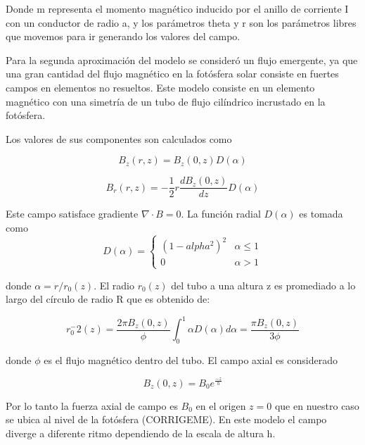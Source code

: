 \documentclass[9pt]{book}
\begin{document}
Donde m representa el momento magn\'etico inducido por el anillo de corriente I con un conductor de radio a, y los par\'ametros theta y r son los par\'ametros libres que movemos para ir generando los valores del campo.

Para la segunda aproximaci\'on del modelo se consider\'o un flujo emergente, ya que una gran cantidad del flujo magn\'etico en la fot\'osfera solar consiste en fuertes campos en elementos no resueltos. Este modelo consiste en un elemento magn\'etico con una simetr\'ia de un tubo de flujo cil\'indrico incrustado en la fot\'osfera.

Los valores de sus componentes son calculados como

\begin{equation}
B_z(r,z)=B_z(0,z)D(\alpha)
\end{equation}

\begin{equation}
B_r(r,z)=-\frac{1}{2}r\frac{dB_z(0,z)}{dz}D(\alpha)
\end{equation}

Este campo satisface gradiente $ \nabla \cdot B = 0 $. La funci\'on radial $D(\alpha)$ es tomada como
\begin{equation}
 D(\alpha) = 
    \begin{cases}
        (1-alpha^2)^2 & \alpha \leq 1 \\
        0   & \alpha > 1
    \end{cases}
\end{equation}

donde $\alpha = r/r_0(z)$. El radio $r_0(z)$ del tubo a una altura z es promediado a lo largo del c\'irculo de radio R que es obtenido de:

\begin{equation} \label{r_flujo_emergente}
r_0^-2(z) = \frac{2\pi B_z(0,z)}{\phi} \int_{0}^{1} \alpha D(\alpha) d\alpha = \frac{\pi B_z(0,z)}{3 \phi}
\end{equation}

donde $\phi$ es el flujo magn\'etico dentro del tubo.
El campo axial es considerado

\begin{equation}
B_z(0,z)=B_0e^{\frac{-z}{h}}
\end{equation}

Por lo tanto la fuerza axial de campo es $B_0$ en el origen $z=0$ que en nuestro caso se ubica al nivel de la fot\'osfera (CORRIGEME). En este modelo el campo diverge a diferente ritmo dependiendo de la escala de altura h.
\end{document}
